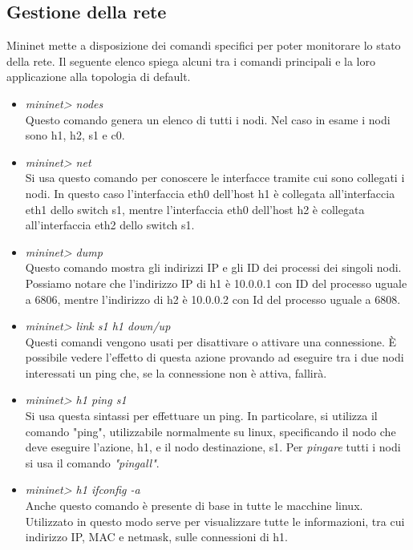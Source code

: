 \subsection{Gestione della rete}\label{ch:2.1.3}
Mininet mette a disposizione dei comandi specifici per poter monitorare lo stato della rete. Il seguente elenco spiega alcuni tra i comandi principali e la loro applicazione alla topologia di default.
\begin{itemize}
	\item \textit{mininet> nodes}\\
	Questo comando genera un elenco di tutti i nodi. Nel caso in esame i nodi sono h1, h2, s1 e c0.
	\item \textit{mininet> net}\\
	Si usa questo comando per conoscere le interfacce tramite cui sono collegati i nodi. In questo caso l'interfaccia eth0 dell'host h1 è collegata all'interfaccia eth1 dello switch s1, mentre l'interfaccia eth0 dell'host h2 è collegata all'interfaccia eth2 dello switch s1.
	\item \textit{mininet> dump}\\
	Questo comando mostra gli indirizzi IP e gli ID dei processi dei singoli nodi. Possiamo notare che l'indirizzo IP di h1 è 10.0.0.1 con ID del processo uguale a 6806, mentre l'indirizzo di h2 è 10.0.0.2 con Id del processo uguale a 6808.
	\item \textit{mininet> link s1 h1 down/up}\\
	Questi comandi vengono usati per disattivare o attivare una connessione. È possibile vedere l'effetto di questa azione provando ad eseguire tra i due nodi interessati un ping che, se la connessione non è attiva, fallirà.
	\item\textit{mininet> h1 ping s1}\\
	Si usa questa sintassi per effettuare un ping. In particolare, si utilizza il comando "ping", utilizzabile normalmente su linux, specificando il nodo che deve eseguire l'azione, h1, e il nodo destinazione, s1. Per \textit{pingare} tutti i nodi si usa il comando \textit{"pingall"}.
	\item\textit{mininet> h1 ifconfig -a}\\
	Anche questo comando è presente di base in tutte le macchine linux. Utilizzato in questo modo serve per visualizzare tutte le informazioni, tra cui indirizzo IP, MAC e netmask, sulle connessioni di h1.
\end{itemize}
